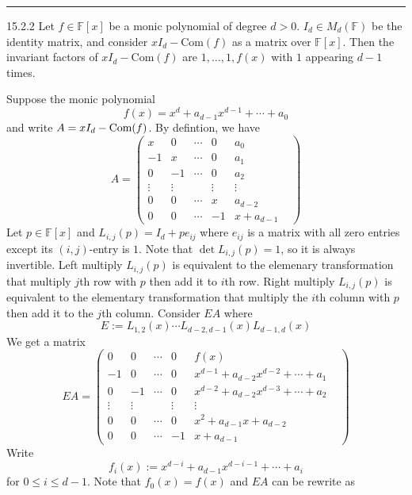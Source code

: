 \documentclass[a4paper, 12pt]{article}
\begin{document}
\noindent\rule{7in}{2.8pt}
\begin{problem}{15.2.2}
Let \(f\in \mathbb{F}[x]\) be a monic polynomial of degree \(d>0\). \(I_d\in M_d(\mathbb{F})\) be the identity matrix, and consider \(xI_d-\text{Com}(f)\) as a matrix over \(\mathbb{F}[x]\). Then the 
invariant factors of \(xI_d-\text{Com}(f)\) are \(1,\ldots,1,f(x)\) with \(1\) appearing \(d-1\) times.    
\end{problem}
\begin{solution}
Suppose the monic polynomial 
\[f(x)=x^d+a_{d-1}x^{d-1}+\cdots+a_0\]
and write \(A=xI_d-\text{Com}(f)\). By defintion, we have
\[A=\begin{pmatrix}
	x&0&\cdots&0&a_0\\ 
	-1&x&\cdots&0&a_1\\ 
	0&-1&\cdots&0&a_2\\ 
	\vdots&\vdots&&\vdots&\vdots&\\ 
	0&0&\cdots&x&a_{d-2}\\ 
	0&0&\cdots&-1&x+a_{d-1}
\end{pmatrix}\] 
Let \(p\in \mathbb{F}[x]\) and \(L_{i,j}(p)=I_d+pe_{ij}\) where \(e_{ij}\) is a matrix with all zero entries except its \((i,j)\)-entry is \(1\). Note that \(\det L_{i,j}(p)=1\), so it is always 
invertible. Left multiply \(L_{i,j}(p)\) is equivalent to the elemenary transformation that multiply \(j\)th row with \(p\) then add it to \(i\)th row. Right multiply 
\(L_{i,j}(p)\) is equivalent to the elementary transformation that multiply the \(i\)th column with \(p\) then add it to the \(j\)th column. Consider \(EA\) where 
\[E:=L_{1,2}(x)\cdots L_{d-2,d-1}(x)L_{d-1,d}(x)\]
We get a matrix 
\[EA=\begin{pmatrix}
	0&0&\cdots&0&f(x)\\ 
	-1&0&\cdots&0&x^{d-1}+a_{d-2}x^{d-2}+\cdots+a_1\\ 
	0&-1&\cdots&0&x^{d-2}+a_{d-2}x^{d-3}+\cdots+a_2\\ 
	\vdots&\vdots&&\vdots&\vdots&\\ 
	0&0&\cdots&0&x^2+a_{d-1}x+a_{d-2}\\ 
	0&0&\cdots&-1&x+a_{d-1}
\end{pmatrix}\]
Write
\[f_i(x):=x^{d-i}+a_{d-1}x^{d-i-1}+\cdots+a_i\]
for \(0\leq i\leq d-1\). Note that \(f_0(x)=f(x)\) and \(EA\) can be rewrite as 

\end{solution}
\end{document}
